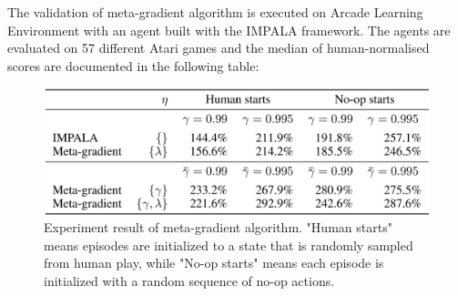 \par
The validation of meta-gradient algorithm is executed on Arcade Learning Environment with an agent built with the IMPALA framework. The agents are evaluated on 57 different Atari games and the median of human-normalised scores are documented in the following table:
\begin{figure}[H]
	\includegraphics[scale=0.3]{meta-gradient-result.png}
	\centering
	\caption{Experiment result of meta-gradient algorithm. "Human starts" means episodes are initialized to a state that is randomly sampled from human play, while "No-op starts" means each episode is initialized with a random sequence of no-op actions.}
	\label{meta-gradient-result}
\end{figure}
% 
% 
% 